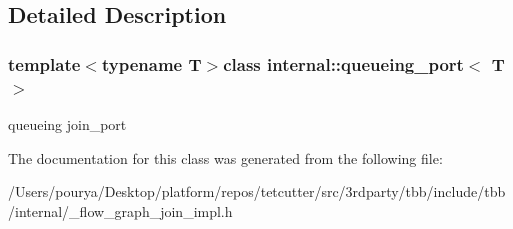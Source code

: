 \subsection{Detailed Description}
\subsubsection*{template$<$typename T$>$class internal\+::queueing\+\_\+port$<$ T $>$}

queueing join\+\_\+port 

The documentation for this class was generated from the following file\+:\begin{DoxyCompactItemize}
\item 
/\+Users/pourya/\+Desktop/platform/repos/tetcutter/src/3rdparty/tbb/include/tbb/internal/\+\_\+flow\+\_\+graph\+\_\+join\+\_\+impl.\+h\end{DoxyCompactItemize}
